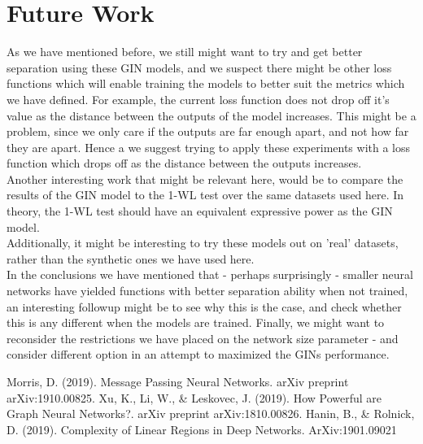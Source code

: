 \documentclass{article}
\begin{document}
\part*{Future Work}
As we have mentioned before, we still might want to try and get better separation using these GIN models,
and we suspect there might be other loss functions which will enable training the models to better suit
the metrics which we have defined. For example, the current loss function does not drop off it's value
as the distance between the outputs of the model increases. This might be a problem, since we
only care if the outputs are far enough apart, and not how far they are apart. Hence a we suggest trying to
apply these experiments with a loss function which drops off as the distance between the outputs increases.\\
Another interesting work that might be relevant here, would be to compare the results of the GIN model to
the 1-WL test over the same datasets used here. In theory, the 1-WL test should have an equivalent expressive power as
the GIN model.\\
Additionally, it might be interesting to try these models out on 'real' datasets,
rather than the synthetic ones we have used here. \\
In the conclusions we have mentioned that - perhaps surprisingly - smaller neural networks have yielded functions with better separation ability when not trained,
an interesting followup might be to see why this is the case, and check whether this is any different when the models are trained.
Finally, we might want to reconsider the restrictions we have placed on the network size parameter - and consider different option
in an attempt to maximized the GINs performance.

\begin{thebibliography}{9}
    Morris, D. (2019). Message Passing Neural Networks. arXiv preprint arXiv:1910.00825.
    Xu, K., Li, W., \& Leskovec, J. (2019). How Powerful are Graph Neural Networks?. arXiv preprint arXiv:1810.00826.
    Hanin, B., \& Rolnick, D. (2019). Complexity of Linear Regions in Deep Networks. ArXiv:1901.09021
\end{thebibliography}
\end{document}
